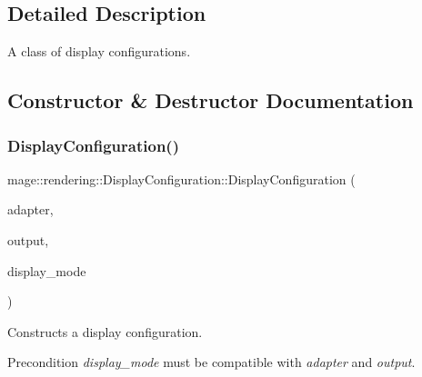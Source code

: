 \subsection{Detailed Description}
A class of display configurations. 

\subsection{Constructor \& Destructor Documentation}
\mbox{\label{classmage_1_1rendering_1_1_display_configuration_ac0ee7768a59ee6a257405faaa942580b}} 
\subsubsection{\texorpdfstring{Display\+Configuration()}{DisplayConfiguration()}\hspace{0.1cm}{\footnotesize\ttfamily [1/3]}}
{\footnotesize\ttfamily mage\+::rendering\+::\+Display\+Configuration\+::\+Display\+Configuration (\begin{DoxyParamCaption}\item[{\mbox{\hyperlink{namespacemage_ae74f374780900893caa5555d1031fd79}{Com\+Ptr}}$<$ \mbox{\hyperlink{namespacemage_1_1rendering_ad55e028ebd705b547eeb972ad8d03b6a}{D\+X\+G\+I\+Adapter}} $>$}]{adapter,  }\item[{\mbox{\hyperlink{namespacemage_ae74f374780900893caa5555d1031fd79}{Com\+Ptr}}$<$ \mbox{\hyperlink{namespacemage_1_1rendering_aaf22d3893277a4bd8497f6ea69b01532}{D\+X\+G\+I\+Output}} $>$}]{output,  }\item[{const D\+X\+G\+I\+\_\+\+M\+O\+D\+E\+\_\+\+D\+E\+SC \&}]{display\+\_\+mode }\end{DoxyParamCaption})\hspace{0.3cm}{\ttfamily [explicit]}}

Constructs a display configuration.

\begin{DoxyPrecond}{Precondition}
{\itshape display\+\_\+mode} must be compatible with {\itshape adapter} and {\itshape output}. 
\end{DoxyPrecond}

